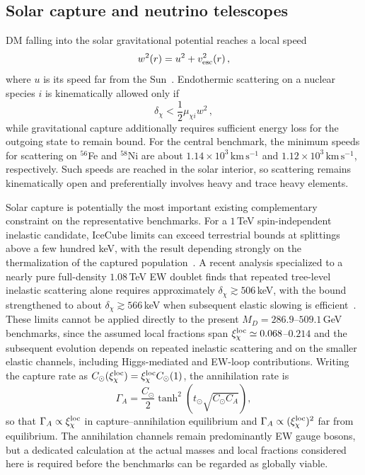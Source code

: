 \documentclass[aps,prd,reprint,preprintnumbers,superscriptaddress,nofootinbib,floatfix]{revtex4-2}
\newcommand{\dchi}{\delta_\chi}
\newcommand{\kms}{\,\mathrm{km\,s^{-1}}}
\begin{document}
\subsection{Solar capture and neutrino telescopes}

DM falling into the solar gravitational potential reaches a local speed
\begin{equation}
    w^2(r)=u^2+v_{\rm esc}^2(r)\,,
    \label{eq:sunvelocity}
\end{equation}
where $u$ is its speed far from the Sun~\cite{Gould:1987ir, Nussinov:2009ft,Blennow:2015hzp,Catena:2018vzc}. Endothermic scattering on a nuclear species $i$ is kinematically allowed only if
\begin{equation}
    \dchi<\frac{1}{2}\mu_{\chi i}w^2\,,
    \label{eq:capturecondition}
\end{equation}
while gravitational capture additionally requires sufficient energy loss for the outgoing state to remain bound. For the central benchmark, the minimum speeds for scattering on $^{56}$Fe and $^{58}$Ni are about $1.14\times10^3\kms$ and $1.12\times10^3\kms$, respectively. Such speeds are reached in the solar interior, so scattering remains kinematically open and preferentially involves heavy and trace heavy elements.

Solar capture is potentially the most important existing complementary constraint on the representative benchmarks. For a $1$\,TeV spin-independent inelastic candidate, IceCube limits can exceed terrestrial bounds at splittings above a few hundred keV, with the result depending strongly on the thermalization of the captured population~\cite{Catena:2018vzc}. A recent analysis specialized to a nearly pure full-density $1.08$\,TeV EW doublet finds that repeated tree-level inelastic scattering alone requires approximately $\dchi\gtrsim506$\,keV, with the bound strengthened to about $\dchi\gtrsim566$\,keV when subsequent elastic slowing is efficient~\cite{Pospelov:2026ewn}. These limits cannot be applied directly to the present $M_D=286.9$--$509.1$\,GeV benchmarks, since the assumed local fractions span $\xi_\chi^{\rm loc}\simeq0.068$--$0.214$ and the subsequent evolution depends on repeated inelastic scattering and on the smaller elastic channels, including Higgs-mediated and EW-loop contributions. Writing the capture rate as $C_\odot(\xi_\chi^{\rm loc})=\xi_\chi^{\rm loc}C_\odot(1)$, the annihilation rate is
\begin{equation}
    \Gamma_A=\frac{C_\odot}{2}\tanh^2\!\left(t_\odot\sqrt{C_\odot C_A}\right),
    \label{eq:solarann}
\end{equation}
so that $\Gamma_A\propto\xi_\chi^{\rm loc}$ in capture--annihilation equilibrium and $\Gamma_A\propto(\xi_\chi^{\rm loc})^2$ far from equilibrium. The annihilation channels remain predominantly EW gauge bosons, but a dedicated calculation at the actual masses and local fractions considered here is required before the benchmarks can be regarded as globally viable.
\end{document}
